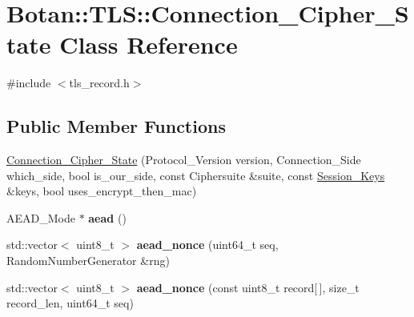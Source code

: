 \hypertarget{class_botan_1_1_t_l_s_1_1_connection___cipher___state}{}\section{Botan\+:\+:T\+LS\+:\+:Connection\+\_\+\+Cipher\+\_\+\+State Class Reference}
\label{class_botan_1_1_t_l_s_1_1_connection___cipher___state}


{\ttfamily \#include $<$tls\+\_\+record.\+h$>$}

\subsection*{Public Member Functions}
\begin{DoxyCompactItemize}
\item 
\mbox{\hyperlink{class_botan_1_1_t_l_s_1_1_connection___cipher___state_a7cac46fbec016d6a6eff0610dc147f85}{Connection\+\_\+\+Cipher\+\_\+\+State}} (Protocol\+\_\+\+Version version, Connection\+\_\+\+Side which\+\_\+side, bool is\+\_\+our\+\_\+side, const Ciphersuite \&suite, const \mbox{\hyperlink{class_botan_1_1_t_l_s_1_1_session___keys}{Session\+\_\+\+Keys}} \&keys, bool uses\+\_\+encrypt\+\_\+then\+\_\+mac)
\item 
\mbox{\label{class_botan_1_1_t_l_s_1_1_connection___cipher___state_a64ee976356b7d836e267cf788507e660}} 
A\+E\+A\+D\+\_\+\+Mode $\ast$ {\bfseries aead} ()
\item 
\mbox{\label{class_botan_1_1_t_l_s_1_1_connection___cipher___state_a80ce544210afd6dafee73cab357bba92}} 
std\+::vector$<$ uint8\+\_\+t $>$ {\bfseries aead\+\_\+nonce} (uint64\+\_\+t seq, Random\+Number\+Generator \&rng)
\item 
\mbox{\label{class_botan_1_1_t_l_s_1_1_connection___cipher___state_ad62b8b1a094992ac79215a4b5d1830fb}} 
std\+::vector$<$ uint8\+\_\+t $>$ {\bfseries aead\+\_\+nonce} (const uint8\+\_\+t record\mbox{[}$\,$\mbox{]}, size\+\_\+t record\+\_\+len, uint64\+\_\+t seq)
\item 
\mbox{\label{class_botan_1_1_t_l_s_1_1_connection___cipher___state_acf5dc9aa2988fc8844cabd96be6a3e2a}} 

\end{DoxyCompactItemize}
